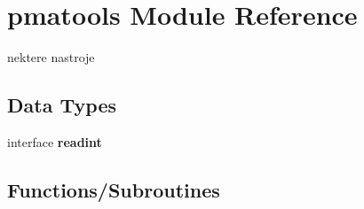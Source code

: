 \section{pmatools Module Reference}
\label{namespacepmatools}


nektere nastroje  


\subsection*{Data Types}
\begin{DoxyCompactItemize}
\item 
interface {\bf readint}
\end{DoxyCompactItemize}
\subsection*{Functions/\+Subroutines}

